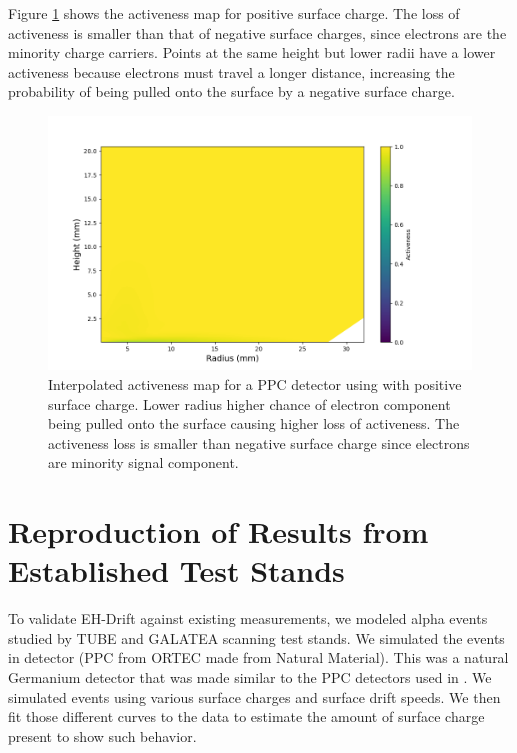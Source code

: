 Figure \ref{ch5_fig_interpolated_activeness_map_pos} shows the activeness map for positive surface charge. The loss of activeness is smaller than that of negative surface charges, since electrons are the minority charge carriers. Points at the same height but lower radii have a lower activeness because electrons must travel a longer distance, increasing the probability of being pulled onto the surface by a negative surface charge.

\begin{figure}%
\centering
\includegraphics[trim={1.5cm 0cm 3.3cm 1cm},clip,width=0.9\linewidth]{ch5/figs/activeness_map_cubic_sc=0.3_ponama_1_5000.png}
\caption{Interpolated activeness map for a PPC detector using \ehd with positive surface charge. Lower radius higher chance of electron component being pulled onto the surface causing higher loss of activeness. The activeness loss is smaller than negative surface charge since electrons are minority signal component.}
\label{ch5_fig_interpolated_activeness_map_pos}
\end{figure}


\section{\label{res:1} Reproduction of Results from Established Test Stands}

To validate EH-Drift against existing measurements, we modeled alpha events studied by TUBE and GALATEA scanning test stands. We simulated the events in {\ponama} detector (PPC from ORTEC made from Natural Material). This was a natural Germanium detector that was made similar to the PPC detectors used in {\MJD}. We simulated events using various surface charges and surface drift speeds.  We then fit those different curves to the data to estimate the amount of surface charge present to show such behavior.

